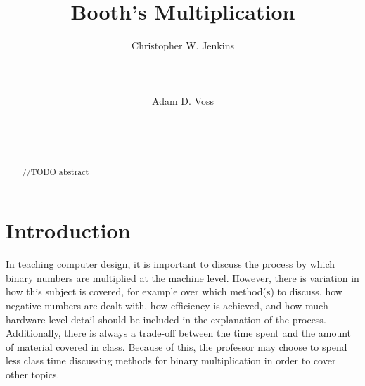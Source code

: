 \documentclass{acm_proc_article-sp}
\begin{document}
\title{Booth's Multiplication}

\author{
    \alignauthor
    Christopher W.
Jenkins\\
       \\
       \\
       \\
    \alignauthor
    Adam D.
Voss\\
       \\
       \\
       \\
}

\maketitle

\begin{abstract}
//TODO abstract
\end{abstract}

\section{Introduction}

In teaching computer design, it is important to discuss the process by which binary numbers are multiplied at the machine level.
However, there is variation in how this subject is covered, for example over which method(s) to discuss, how negative numbers are dealt with, how efficiency is achieved, and how much hardware-level detail should be included in the explanation of the process.
Additionally, there is always a trade-off between the time spent and the amount of material covered in class.
Because of this, the professor may choose to spend less class time discussing methods for binary multiplication in order to cover other topics.
\end{document}
